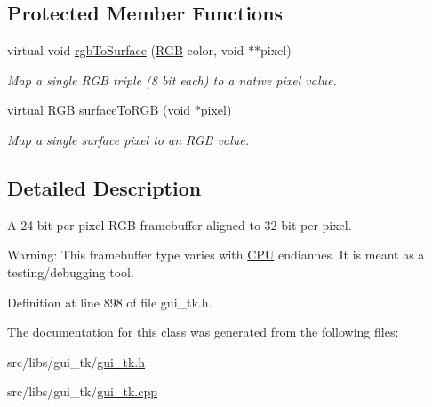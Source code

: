 \subsection*{Protected Member Functions}
\begin{DoxyCompactItemize}
\item 
\hypertarget{classGUI_1_1ScreenRGB32le_ab7657b6a960ab081be4c9adecdaa0750}{virtual void \hyperlink{classGUI_1_1ScreenRGB32le_ab7657b6a960ab081be4c9adecdaa0750}{rgb\-To\-Surface} (\hyperlink{namespaceGUI_aeafd135255365f3584da0e982fc79466}{R\-G\-B} color, void $\ast$$\ast$pixel)}\label{classGUI_1_1ScreenRGB32le_ab7657b6a960ab081be4c9adecdaa0750}

\begin{DoxyCompactList}\small\item\em Map a single R\-G\-B triple (8 bit each) to a native pixel value. \end{DoxyCompactList}\item 
\hypertarget{classGUI_1_1ScreenRGB32le_ad6fbb227845ecca03bf04d344a40dce9}{virtual \hyperlink{namespaceGUI_aeafd135255365f3584da0e982fc79466}{R\-G\-B} \hyperlink{classGUI_1_1ScreenRGB32le_ad6fbb227845ecca03bf04d344a40dce9}{surface\-To\-R\-G\-B} (void $\ast$pixel)}\label{classGUI_1_1ScreenRGB32le_ad6fbb227845ecca03bf04d344a40dce9}

\begin{DoxyCompactList}\small\item\em Map a single surface pixel to an R\-G\-B value. \end{DoxyCompactList}\end{DoxyCompactItemize}


\subsection{Detailed Description}
A 24 bit per pixel R\-G\-B framebuffer aligned to 32 bit per pixel. 

Warning\-: This framebuffer type varies with \hyperlink{classCPU}{C\-P\-U} endiannes. It is meant as a testing/debugging tool. 

Definition at line 898 of file gui\-\_\-tk.\-h.



The documentation for this class was generated from the following files\-:\begin{DoxyCompactItemize}
\item 
src/libs/gui\-\_\-tk/\hyperlink{gui__tk_8h}{gui\-\_\-tk.\-h}\item 
src/libs/gui\-\_\-tk/\hyperlink{gui__tk_8cpp}{gui\-\_\-tk.\-cpp}\end{DoxyCompactItemize}
